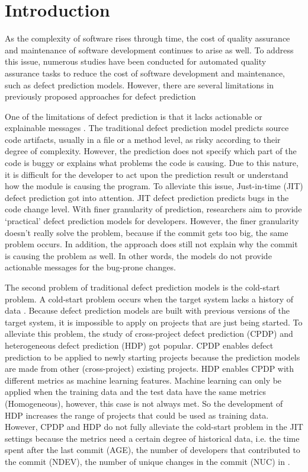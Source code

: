 \section{Introduction}
As the complexity of software rises through time, the cost of quality assurance and maintenance of software development continues to arise as well.
To address this issue, numerous studies have been conducted for automated quality assurance tasks to reduce the cost of software development and maintenance, such as defect prediction models.
However, there are several limitations in previously proposed approaches for defect prediction 

One of the limitations of defect prediction is that it lacks actionable or explainable messages \cite{lewis2013does}.
The traditional defect prediction model predicts source code artifacts, usually in a file or a method level, as risky according to their degree of complexity.
However, the prediction does not specify which part of the code is buggy or explains what problems the code is causing. 
Due to this nature, it is difficult for the developer to act upon the prediction result or understand how the module is causing the program.
To alleviate this issue, Just-in-time (JIT) defect prediction got into attention.
JIT defect prediction predicts bugs in the code change level.
With finer granularity of prediction, researchers aim to provide `practical' defect prediction models for developers.
However, the finer granularity doesn't really solve the problem, because if the commit gets too big, the same problem occurs. In addition, the approach does still not explain why the commit is causing the problem as well. In other words, the models do not provide actionable messages for the bug-prone changes.

The second problem of traditional defect prediction models is the cold-start problem. 
A cold-start problem occurs when the target system lacks a history of data \cite{schein2002methods}. 
Because defect prediction models are built with previous versions of the target system, it is impossible to apply on projects that are just being started.
To alleviate this problem, the study of cross-project defect prediction (CPDP) and heterogeneous defect prediction (HDP) got popular. 
CPDP enables defect prediction to be applied to newly starting projects because the prediction models are made from other (cross-project) existing projects.
HDP enables CPDP with different metrics as machine learning features.
Machine learning can only be applied when the training data and the test data have the same metrics (Homogeneous), however, this case is not always met.
So the development of HDP increases the range of projects that could be used as training data.
However, CPDP and HDP do not fully alleviate the cold-start problem in the JIT settings because the metrics need a certain degree of historical data, i.e. the time spent after the last commit (AGE), the number of developers that contributed to the commit (NDEV), the number of unique changes in the commit (NUC) in \cite{kamei2012large}.

